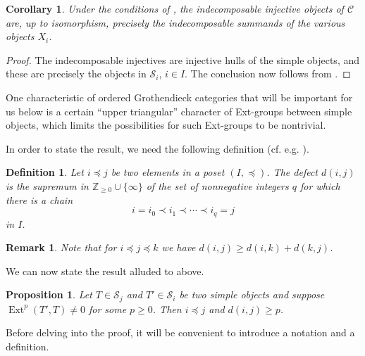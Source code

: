 \documentclass[11pt]{article}
\theoremstyle{plain}
\newtheorem{proposition}[lemma]{Proposition}
\newtheorem{corollary}[lemma]{Corollary}
\theoremstyle{nonumberplain}
\theoremstyle{plain}
\newtheorem{definition}[lemma]{Definition}
\newtheorem{remark}[lemma]{Remark}
\theoremstyle{nonumberplain}
\newtheorem{proof}{Proof}
\newcommand\cC{\mathcal C}
\newcommand\cS{\mathcal S}
\DeclareMathOperator{\ext}{\mathrm{Ext}}
\begin{document}
\begin{corollary}\label{cor.indec-inj}
  Under the conditions of , the indecomposable injective objects
  of $\cC$ are, up to isomorphism, precisely the indecomposable summands of the various
  objects $X_i$. 
\end{corollary}
\begin{proof}
  The indecomposable injectives are injective hulls of the simple
  objects, and these are precisely the objects in $\cS_i$, $i\in
  I$. The conclusion now follows from . 
\end{proof}



One characteristic of ordered Grothendieck categories that will be
important for us below is a certain ``upper triangular'' character of
Ext-groups between simple objects, which limits the possibilities for such Ext-groups to be nontrivial. 

In order to state the result, we need the following definition (cf.
e.g. \cite[$\S$2.2]{us}). 





\begin{definition}\label{def.def}
  Let $i{\preceq} j$ be two elements in a poset $(I,{\preceq})$. The {\it defect}
  $d(i,j)$ is the supremum in $\mathbb{Z}_{\geq0}\cup\{\infty\}$ of the set of
  nonnegative integers $q$ for which there is a chain
  \begin{equation*}
    i=i_0{\prec i_1\prec \cdots\prec} i_q=j
  \end{equation*}
in $I$.
\end{definition}


\begin{remark}\label{re.def}
  Note that for $i{\preceq j\preceq} k$ we have $d(i,j)\ge d(i,k)+d(k,j)$. 
\end{remark}


We can now state the result alluded to above. 


\begin{proposition}\label{pr.up-tri}
  Let $T\in \cS_j$ and $T'\in \cS_i$ be two simple objects and suppose
  $\ext^p(T',T)\ne 0$ for some $p\ge 0$. Then $i{\preceq} j$ and $d(i,j)\ge p$.   
\end{proposition}



Before delving into the proof, it will be convenient to introduce a notation and a definition. 
\end{document}
